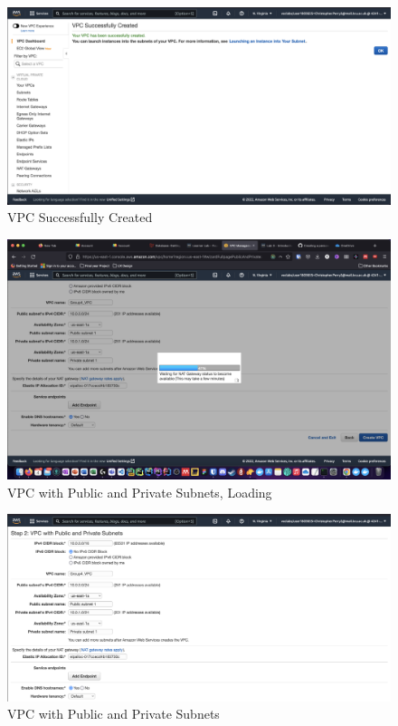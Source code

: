 \begin{figure}[H]
    \centering
        \includegraphics[width=\textwidth]{resources/vpc-successfully-created.png}
    \caption{VPC Successfully Created}
    \label{fig:vpc-successfully-created}
\end{figure}

\begin{figure}[H]
    \centering
        \includegraphics[width=\textwidth]{resources/vpc-with-public-and-private-subnets-loading.png}
    \caption{VPC with Public and Private Subnets, Loading}
    \label{fig:vpc-with-public-and-private-subnets-loading}
\end{figure}

\begin{figure}[H]
    \centering
        \includegraphics[width=\textwidth]{resources/vpc-with-public-and-private-subnets.png}
    \caption{VPC with Public and Private Subnets}
    \label{fig:vpc-with-public-and-private-subnets}
\end{figure}

